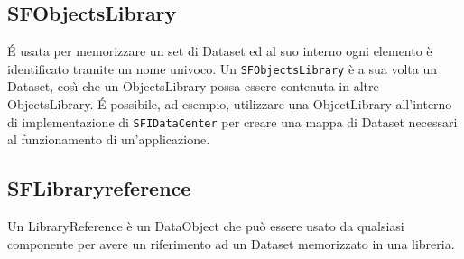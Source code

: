 \subsection{SFObjectsLibrary}
\label{sub:sfobjectslibrary}
\'E usata per memorizzare un set di Dataset ed al suo interno ogni elemento \`e identificato tramite un nome univoco.
Un \texttt{SFObjectsLibrary} \`e a sua volta un Dataset, cos{\`\i} che un ObjectsLibrary possa essere contenuta in altre ObjectsLibrary.
\'E possibile, ad esempio, utilizzare una ObjectLibrary all'interno di implementazione di \texttt{SFIDataCenter} per creare una mappa di Dataset necessari al funzionamento di un'applicazione.

\subsection{SFLibraryreference}
\label{sub:sflibraryreference}
Un LibraryReference \`e un DataObject che pu\`o essere usato da qualsiasi componente per avere un riferimento ad un Dataset memorizzato in una libreria.